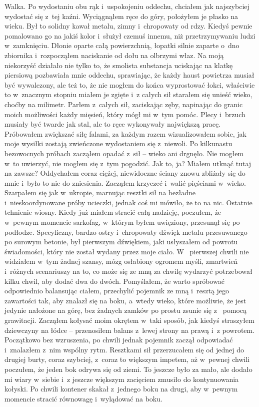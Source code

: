 Walka. Po wydostaniu obu rąk i~uspokojeniu oddechu, chciałem jak najszybciej wydostać się z~tej kaźni. Wyciągnąłem 
ręce do góry, położyłem je płasko na wieku. Był to solidny kawał metalu, zimny i~chropowaty od rdzy. Kiedyś pewnie 
pomalowano go na jakiś kolor i~służył czemuś innemu, niż przetrzymywaniu ludzi w~zamknięciu. Dłonie oparte całą 
powierzchnią, łopatki silnie zaparte o~dno zbiornika i~rozpocząłem naciskanie od dołu na olbrzymi właz. Na moją 
niekorzyść działało nie tylko to, że smolista substancja uciskając na klatkę piersiową pozbawiała mnie oddechu, 
sprawiając, że każdy haust powietrza musiał być wywalczony, ale też to, że nie mogłem do końca wyprostować łokci, 
właściwie to w~znacznym stopniu miałem je zgięte i~z całych sił starałem się unieść wieko, choćby na milimetr. Parłem 
z~całych sił, zaciskając zęby, napinając do granic moich możliwości każdy mięsień, który mógł mi w~tym pomóc. Plecy 
i~brzuch musiały być twarde jak stal, ale to ręce wykonywały największą pracę. Próbowałem zwiększać siłę falami, za 
każdym razem wizualizowałem sobie, jak moje wysiłki zostają zwieńczone wydostaniem się z~niewoli. Po kilkunastu 
bezowocnych próbach zacząłem opadać z~sił -- wieko ani drgnęło. Nie mogłem w~to uwierzyć, nie mogłem się z~tym 
pogodzić. Jak to, ja? Miałem utknąć tutaj na zawsze? Oddychałem coraz ciężej, niewidoczne ściany znowu zbliżały się 
do mnie i~było to nie do zniesienia. Zacząłem krzyczeć i~walić pięściami w~wieko. Szarpałem się jak w~ukropie, 
marnując resztki sił na bezładne i~nieskoordynowane próby ucieczki, jednak coś mi mówiło, że to na nic. Ostatnie 
tchnienie wiosny. Kiedy już miałem stracić całą nadzieję, poczułem, że w~pewnym momencie sarkofag, w~którym byłem 
uwięziony, przesunął się po podłodze. Specyficzny, bardzo ostry i~chropowaty dźwięk metalu przesuwanego po surowym 
betonie, był pierwszym dźwiękiem, jaki usłyszałem od powrotu świadomości, który nie został wydany przez moje ciało. W~
pierwszej chwili nie widziałem w~tym żadnej szansy, mózg osłabiony ogromem myśli, zmartwień i~różnych scenariuszy na 
to, co może się ze mną za chwilę wydarzyć potrzebował kilku chwil, aby dodać dwa do dwóch. Pomyślałem, że warto 
spróbować odpowiednio balansując ciałem, przechylić pojemnik ze mną i~resztą jego zawartości tak, aby znalazł się na 
boku, a~wtedy wieko, które możliwie, że jest jedynie nałożone na górę, bez żadnych zamków po prostu zsunie się z~
pomocą grawitacji. Zacząłem kołysać moim okrętem w~taki sposób, jak kiedyś straszyłem dziewczyny na łódce -- 
przenosiłem balans z~lewej strony na prawą i~z powrotem. Początkowo bez wzruszenia, po chwili jednak pojemnik  zaczął 
odpowiadać i~znalazłem z~nim wspólny rytm. Resztkami sił przerzucałem się od jednej do drugiej burty, coraz szybciej, 
z~coraz to większym impetem, aż w~pewnej chwili poczułem, że jeden bok odrywa się od ziemi. To jeszcze było za mało, 
ale dodało mi wiary w~siebie i~z jeszcze większym zacięciem zmusiło do kontynuowania kołyski. Po chwili kontener 
skakał z~jednego boku na drugi, aby w~pewnym momencie stracić równowagę i~wylądować na boku. 

